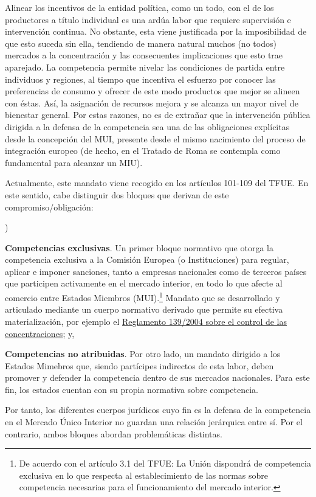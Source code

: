 \documentclass[10pt,a4paper]{article}
\newcounter{alphaitem}
\newenvironment{la}
      {\begin{list}{\alph{alphaitem})}{%
          \usecounter{alphaitem}%
          \setlength{\leftmargin}{1cm}%
          \setlength{\parskip}{3pt}%
          \setlength{\itemsep}{0pt}%
          \setlength{\parsep}{0pt}%
      }}
      {\end{list}}
\begin{document}
Alinear los incentivos de la entidad política, como un todo, con el de los productores a título individual es una ardúa labor que requiere supervisión e intervención continua. No obstante, esta viene justificada por la imposibilidad de que esto suceda sin ella, tendiendo de manera natural muchos (no todos) mercados a la concentración y las consecuentes implicaciones que esto trae aparejado. La competencia permite nivelar las condiciones de partida entre individuos y regiones, al tiempo que incentiva el esfuerzo por conocer las preferencias de consumo y ofrecer de este modo productos que mejor se alineen con éstas. Así, la asignación de recursos mejora y se alcanza un mayor nivel de bienestar general. Por estas razones, no es de extrañar que la intervención pública dirigida a la defensa de la competencia sea una de las obligaciones explícitas desde la concepción del MUI, presente desde el mismo nacimiento del proceso de integración europeo (de hecho, en el Tratado de Roma se contempla como fundamental para alcanzar un MIU). 

Actualmente, este mandato viene recogido en los artículos 101-109 del TFUE. En este sentido, cabe distinguir dos bloques que derivan de este compromiso/obligación:
\begin{la}
    \item \textbf{Competencias exclusivas}. Un primer bloque normativo que otorga la competencia exclusiva a la Comisión Europea (o Instituciones) para regular, aplicar e imponer sanciones, tanto a empresas nacionales como de terceros países que participen activamente en el mercado interior, en todo lo que afecte al comercio entre Estados Miembros (MUI).\footnote{%
        De acuerdo con el artículo 3.1 del TFUE: La Unión dispondrá de competencia exclusiva en lo que respecta al establecimiento de las normas sobre competencia necesarias para el funcionamiento del mercado interior.
    } Mandato que se desarrollado y articulado mediante un cuerpo normativo derivado que permite su efectiva materialización, por ejemplo el \href{}{Reglamento 139/2004 sobre el control de las concentraciones}; y,
    \item \textbf{Competencias no atribuidas}. Por otro lado, un mandato dirigido a los Estados Mimebros que, siendo partícipes indirectos de esta labor, deben promover y defender la competencia dentro de sus mercados nacionales. Para este fin, los estados  cuentan con su propia normativa sobre competencia.
\end{la}

Por tanto, los diferentes cuerpos jurídicos cuyo fin es la defensa de la competencia en el Mercado Único Interior no guardan una relación jerárquica entre sí. Por el contrario, ambos bloques abordan problemáticas distintas.
\end{document}
